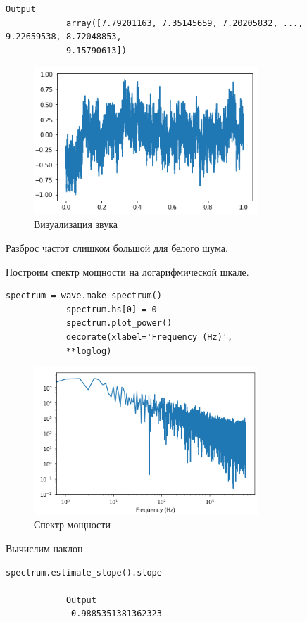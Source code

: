 \documentclass[a4paper,12pt]{article}
\begin{document}
\begin{enumerate}
\begin{lstlisting}[caption=Создание и визуализация звука]
			Output
			array([7.79201163, 7.35145659, 7.20205832, ..., 9.22659538, 8.72048853,
			9.15790613])
		\end{lstlisting}
		\begin{figure}[H]
			\centering
			\includegraphics[width=0.75\textwidth]{5_1.png}
			\caption{Визуализация звука}
			\label{fig:5.1}
		\end{figure}
		
		Разброс частот слишком большой для белого шума.
		
		Построим спектр мощности на логарифмической шкале.
		\begin{lstlisting}[caption=Спектр мощности]
			spectrum = wave.make_spectrum()
			spectrum.hs[0] = 0
			spectrum.plot_power()
			decorate(xlabel='Frequency (Hz)',
			**loglog)
		\end{lstlisting}
		\begin{figure}[H]
			\centering
			\includegraphics[width=0.75\textwidth]{5_2.png}
			\caption{Спектр мощности}
			\label{fig:5.2}
		\end{figure}
		
		Вычислим наклон
		\begin{lstlisting}[caption=Вычисление наклона]
			spectrum.estimate_slope().slope
			
			Output
			-0.9885351381362323
		\end{lstlisting}
	

\end{enumerate}
\end{document}
